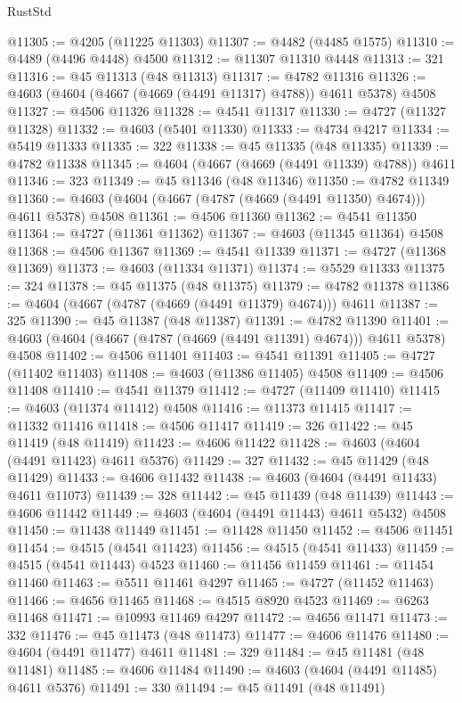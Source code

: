 \begin{lexlean}{RustStd}
\begin{coremodule}
@11305 := @4205 (@11225 @11303)
@11307 := @4482 (@4485 @1575)
@11310 := @4489 (@4496 @4448) @4500
@11312 := @11307 @11310 @4448
@11313 := 321
@11316 := @45 @11313 (@48 @11313)
@11317 := @4782 @11316
@11326 := @4603 (@4604 (@4667 (@4669 (@4491 @11317) @4788)) @4611 @5378) @4508
@11327 := @4506 @11326
@11328 := @4541 @11317
@11330 := @4727 (@11327 @11328)
@11332 := @4603 (@5401 @11330)
@11333 := @4734 @4217
@11334 := @5419 @11333
@11335 := 322
@11338 := @45 @11335 (@48 @11335)
@11339 := @4782 @11338
@11345 := @4604 (@4667 (@4669 (@4491 @11339) @4788)) @4611
@11346 := 323
@11349 := @45 @11346 (@48 @11346)
@11350 := @4782 @11349
@11360 := @4603 (@4604 (@4667 (@4787 (@4669 (@4491 @11350) @4674))) @4611 @5378) @4508
@11361 := @4506 @11360
@11362 := @4541 @11350
@11364 := @4727 (@11361 @11362)
@11367 := @4603 (@11345 @11364) @4508
@11368 := @4506 @11367
@11369 := @4541 @11339
@11371 := @4727 (@11368 @11369)
@11373 := @4603 (@11334 @11371)
@11374 := @5529 @11333
@11375 := 324
@11378 := @45 @11375 (@48 @11375)
@11379 := @4782 @11378
@11386 := @4604 (@4667 (@4787 (@4669 (@4491 @11379) @4674))) @4611
@11387 := 325
@11390 := @45 @11387 (@48 @11387)
@11391 := @4782 @11390
@11401 := @4603 (@4604 (@4667 (@4787 (@4669 (@4491 @11391) @4674))) @4611 @5378) @4508
@11402 := @4506 @11401
@11403 := @4541 @11391
@11405 := @4727 (@11402 @11403)
@11408 := @4603 (@11386 @11405) @4508
@11409 := @4506 @11408
@11410 := @4541 @11379
@11412 := @4727 (@11409 @11410)
@11415 := @4603 (@11374 @11412) @4508
@11416 := @11373 @11415
@11417 := @11332 @11416
@11418 := @4506 @11417
@11419 := 326
@11422 := @45 @11419 (@48 @11419)
@11423 := @4606 @11422
@11428 := @4603 (@4604 (@4491 @11423) @4611 @5376)
@11429 := 327
@11432 := @45 @11429 (@48 @11429)
@11433 := @4606 @11432
@11438 := @4603 (@4604 (@4491 @11433) @4611 @11073)
@11439 := 328
@11442 := @45 @11439 (@48 @11439)
@11443 := @4606 @11442
@11449 := @4603 (@4604 (@4491 @11443) @4611 @5432) @4508
@11450 := @11438 @11449
@11451 := @11428 @11450
@11452 := @4506 @11451
@11454 := @4515 (@4541 @11423)
@11456 := @4515 (@4541 @11433)
@11459 := @4515 (@4541 @11443) @4523
@11460 := @11456 @11459
@11461 := @11454 @11460
@11463 := @5511 @11461 @4297
@11465 := @4727 (@11452 @11463)
@11466 := @4656 @11465
@11468 := @4515 @8920 @4523
@11469 := @6263 @11468
@11471 := @10993 @11469 @4297
@11472 := @4656 @11471
@11473 := 332
@11476 := @45 @11473 (@48 @11473)
@11477 := @4606 @11476
@11480 := @4604 (@4491 @11477) @4611
@11481 := 329
@11484 := @45 @11481 (@48 @11481)
@11485 := @4606 @11484
@11490 := @4603 (@4604 (@4491 @11485) @4611 @5376)
@11491 := 330
@11494 := @45 @11491 (@48 @11491)

\end{coremodule}
\end{lexlean}
